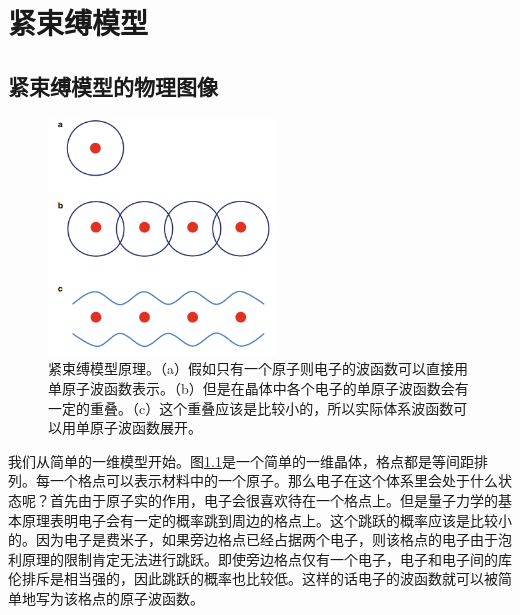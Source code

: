 \chapter{紧束缚模型}
\section{紧束缚模型的物理图像}
 \begin {figure}[tbp]
\centering 
\includegraphics[width=6cm]{./images/tightbindPic.png} 
\caption{紧束缚模型原理。（a）假如只有一个原子则电子的波函数可以直接用单原子波函数表示。（b）但是在晶体中各个电子的单原子波函数会有一定的重叠。（c）这个重叠应该是比较小的，所以实际体系波函数可以用单原子波函数展开。\cite{topoText}}
\label{tightbindPic}
\end {figure} 
我们从简单的一维模型开始。图\ref{tightbindPic}是一个简单的一维晶体，格点都是等间距排列。每一个格点可以表示材料中的一个原子。那么电子在这个体系里会处于什么状态呢？首先由于原子实的作用，电子会很喜欢待在一个格点上。但是量子力学的基本原理表明电子会有一定的概率跳到周边的格点上。这个跳跃的概率应该是比较小的。因为电子是费米子，如果旁边格点已经占据两个电子，则该格点的电子由于泡利原理的限制肯定无法进行跳跃。即使旁边格点仅有一个电子，电子和电子间的库伦排斥是相当强的，因此跳跃的概率也比较低。这样的话电子的波函数就可以被简单地写为该格点的原子波函数。

